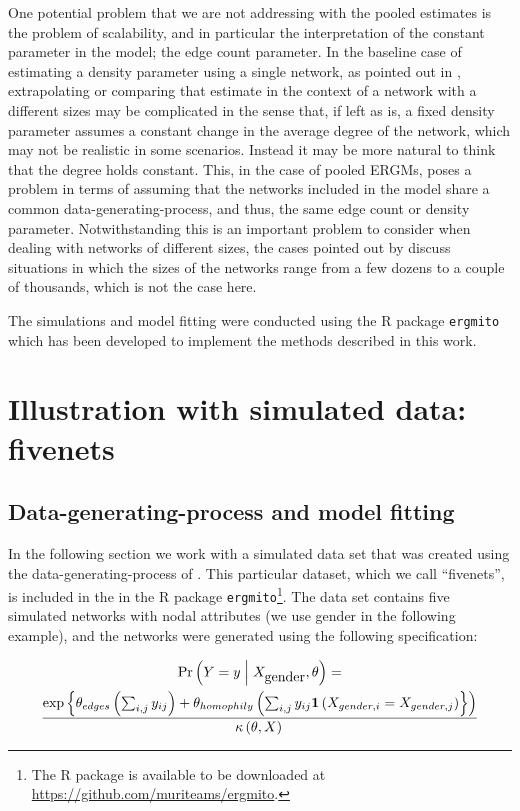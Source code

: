 \documentclass[12pt]{article}
\begin{document}
One potential problem that we are not addressing with the pooled estimates is the problem of scalability, and in particular the interpretation of the constant parameter in the model; the edge count parameter. In the baseline case of estimating a density parameter using a single network, as pointed out in \cite{Krivitsky2011}, extrapolating or comparing that estimate in the context of a network with a different sizes may be complicated in the sense that, if left as is, a fixed density parameter assumes a constant change in the average degree of the network, which may not be realistic in some scenarios. Instead it may be more natural to think that the degree holds constant. This, in the case of pooled ERGMs, poses a problem in terms of assuming that the networks included in the model share a common data-generating-process, and thus, the same edge count or density parameter. Notwithstanding this is an important problem to consider when dealing with networks of different sizes, the cases pointed out by \cite{Krivitsky2011} discuss situations in which the sizes of the networks range from a few dozens to a couple of thousands, which is not the case here.

The simulations and model fitting were conducted using the R package \texttt{ergmito} which has been developed to implement the methods described in this work.

\section{Illustration with simulated data: fivenets}

\subsection{Data-generating-process and model fitting}

In the following section we work with a simulated data set that was created using the data-generating-process of \ergmitos{}. This particular dataset, which we call ``fivenets'', is included in the in the R package \texttt{ergmito}\footnote{The R package is available to be downloaded at  \url{https://github.com/muriteams/ergmito}.}. The data set contains five simulated networks with nodal attributes (we use gender in the following example), and the networks were generated using the following specification:

\begin{multline*}
\Prcond{\Adjmat = \adjmat}{\Indepvar_{\mbox{gender}}, \params} = \\
\frac{ %
    \exp{\params_{edges}\left(\sum_{i,j} \adjmat_{ij}\right) + %
    \params_{homophily}\left(\sum_{i,j} \adjmat_{ij}\isone{\Indepvar_{gender, i} = \Indepvar_{gender, j}}}\right) %
    }{%
    \normconst{}
    }
\end{multline*}
\end{document}
